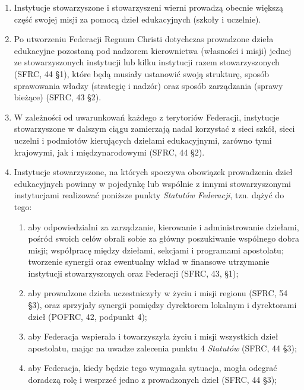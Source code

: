 \begin{enumerate}
\item Instytucje stowarzyszone i stowarzyszeni wierni prowadzą obecnie większą część swojej misji za pomocą dzieł edukacyjnych (szkoły i uczelnie).


\item Po utworzeniu Federacji Regnum Christi dotychczas prowadzone dzieła edukacyjne pozostaną pod nadzorem kierownictwa (własności i misji) jednej ze stowarzyszonych instytucji lub kilku instytucji razem stowarzyszonych (SFRC, 44 \S{}1), które będą musiały ustanowić swoją strukturę, sposób sprawowania władzy (strategię i nadzór) oraz sposób zarządzania (sprawy bieżące) (SFRC, 43 \S{}2).


\item W zależności od uwarunkowań każdego z terytoriów Federacji, instytucje stowarzyszone w dalszym ciągu zamierzają nadal korzystać z sieci szkół, sieci uczelni i podmiotów kierujących dziełami edukacyjnymi, zarówno tymi krajowymi, jak i międzynarodowymi (SFRC, 44 \S{}2).


\item Instytucje stowarzyszone, na których spoczywa obowiązek prowadzenia dzieł edukacyjnych powinny w pojedynkę lub wspólnie z innymi stowarzyszonymi instytucjami realizować poniższe punkty {\em Statutów Federacji}, tzn. dążyć do tego:


\begin{enumerate}


\item aby odpowiedzialni za zarządzanie, kierowanie i administrowanie dziełami, pośród swoich celów obrali sobie za główny poszukiwanie wspólnego dobra misji; współpracę między dziełami, sekcjami i programami apostolatu; tworzenie synergii oraz ewentualny wkład w finansowe utrzymanie instytucji stowarzyszonych oraz Federacji (SFRC, 43, \S{}1);


\item aby prowadzone dzieła uczestniczyły w życiu i misji regionu (SFRC, 54 \S{}3), oraz sprzyjały synergii pomiędzy dyrektorem lokalnym i dyrektorami dzieł (POFRC, 42, podpunkt 4);


\item aby Federacja wspierała i towarzyszyła życiu i misji wszystkich dzieł apostolatu, mając na uwadze zalecenia punktu 4 {\em Statutów} (SFRC, 44 \S{}3);


\item aby Federacja, kiedy będzie tego wymagała sytuacja, mogła odegrać doradczą rolę i wesprzeć jedno z prowadzonych dzieł (SFRC, 44 \S{}3);



\end{enumerate}
\end{enumerate}
